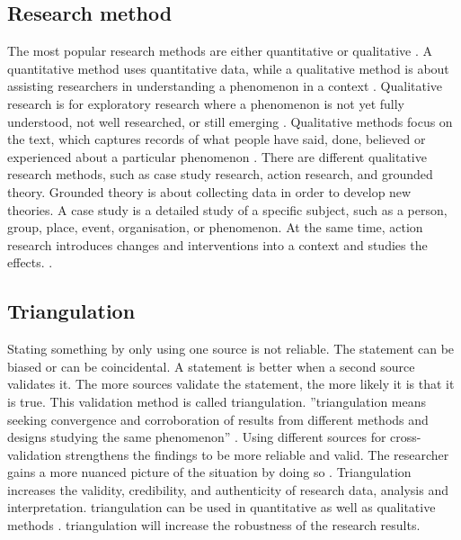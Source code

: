 \subsection{Research method}
\label{sub:researchmethods}
The most popular research methods are either quantitative or qualitative \parencite[p.~62]{Recker2012}. A quantitative method uses quantitative data, while a qualitative method is about assisting researchers in understanding a phenomenon in a context \parencite[p.~84]{Recker2012}. Qualitative research is for exploratory research where a phenomenon is not yet fully understood, not well researched, or still emerging \textcite[p.~84]{Recker2012}. Qualitative methods focus on the text, which captures records of what people have said, done, believed or experienced about a particular phenomenon \parencite[p.~85]{Recker2012}. There are different qualitative research methods, such as case study research, action research, and grounded theory. Grounded theory is about collecting data in order to develop new theories. A case study is a detailed study of a specific subject, such as a person, group, place, event, organisation, or phenomenon. At the same time, action research introduces changes and interventions into a context and studies the effects. \parencite[pp.~96--99]{Recker2012}.

\subsection{Triangulation}
\label{sub:triangulation}
Stating something by only using one source is not reliable. The statement can be biased or can be coincidental. A statement is better when a second source validates it. The more sources validate the statement, the more likely it is that it is true. This validation method is called \gls{triangulation}. ''\Gls{triangulation} means seeking convergence and corroboration of results from different methods and designs studying the same phenomenon'' \parencite[p.~110]{Recker2012}. Using different sources for cross-validation strengthens the findings to be more reliable and valid. The researcher gains a more nuanced picture of the situation by doing so \parencite[p.~88]{Recker2012}. Triangulation increases the validity, credibility, and authenticity of research data, analysis and interpretation. \Gls{triangulation} can be used in quantitative as well as qualitative methods \parencite[p.~88]{Recker2012}. \Gls{triangulation} will increase the robustness of the research results.

